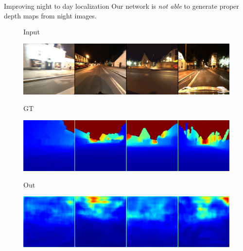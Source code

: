 \documentclass[final]{beamer}
\newlength{\colwidth}
\begin{document}
\begin{frame}[t]
\begin{columns}[t]
\begin{column}{\colwidth}
  \begin{block}{Improving night to day localization}
     Our network is \textit{not able} to generate proper depth maps from night images.
  \begin{figure}
	\centering
    	\begin{minipage}{0.15\linewidth}
			\raggedright \footnotesize
			Input
		\end{minipage}
		\begin{minipage}{0.7\linewidth}
			\includegraphics[width=\linewidth]{im/res/night_input}
		\end{minipage}
		
    	\vspace{-0.5cm}
		\begin{minipage}{0.15\linewidth}
			\raggedright \footnotesize
			GT
		\end{minipage}
		\begin{minipage}{0.7\linewidth}
			\includegraphics[width=\linewidth]{im/res/night_gt}
		\end{minipage}
		
    	\vspace{-0.5cm}
		\begin{minipage}{0.15\linewidth}
			\raggedright \footnotesize
			Out
		\end{minipage}
		\begin{minipage}{0.7\linewidth}
			\includegraphics[width=\linewidth]{im/res/night_noft}
		\end{minipage}


\end{figure}
\end{block}
\end{column}
\end{columns}
\end{frame}
\end{document}
